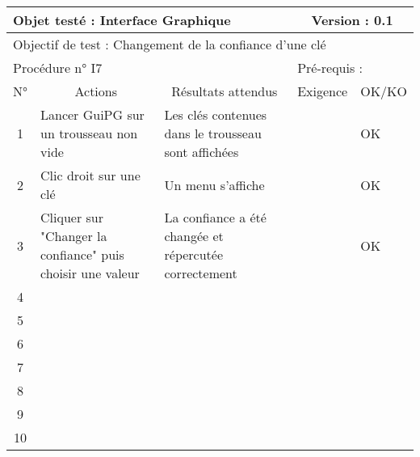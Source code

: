 \documentclass{../res/univ-projet}
\begin{document}
\begin{center}
    \begin{tabular}{|c|p{5cm}|p{5cm}|p{1.5cm}|p{1.5cm}|}
      \hline
      \multicolumn{3}{|l|}{Objet testé : Interface Graphique} & \multicolumn{2}{c|}{Version : 0.1}\\ \hline
      \multicolumn{5}{|l|}{Objectif de test : Changement de la confiance d'une clé}\\ \hline
      \multicolumn{3}{|l|}{Procédure n° I7} & \multicolumn{2}{p{3cm}|}{Pré-requis : }\\ \hline
      \multicolumn{1}{|c|}{N°} & \multicolumn{1}{c|}{Actions} & \multicolumn{1}{c|}{Résultats attendus} & 
      \multicolumn{1}{c|}{Exigence} & \multicolumn{1}{c|}{OK/KO}\\ \hline
      1 & Lancer GuiPG sur un trousseau non vide & Les clés contenues dans le trousseau sont affichées &  & OK \\
      2 & Clic droit sur une clé & Un menu s'affiche &  & OK\\
      3 & Cliquer sur "Changer la confiance" puis choisir une valeur & La confiance a été changée et répercutée correctement &  & OK\\ 
      4 &  &  &  & \\
      5 &  &  &  & \\
      6 &  &  &  & \\
      7 &  &  &  & \\
      8 &  &  &  & \\
      9 &  &  &  & \\
      10 &  &  &  &\\ 
	\hline
    \end{tabular}
    \vskip 2.2cm


\end{center}
\end{document}
